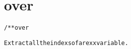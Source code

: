 \section{over}
\begin{shaded}
\begin{alltt}
/** over

Extract all the indexs of a rexx variable.

\end{alltt}
\end{shaded}
